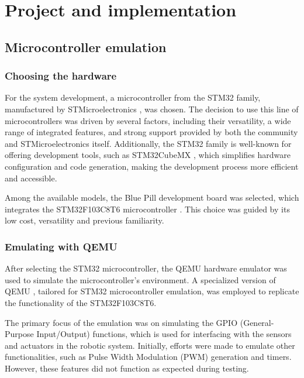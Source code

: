 \documentclass[../../monografia.tex]{subfiles}
\begin{document}
\section{Project and implementation}

\subsection{Microcontroller emulation}

\subsubsection{Choosing the hardware}

For the system development, a microcontroller from the STM32 family, manufactured by STMicroelectronics \cite{STMicroelectronics_23}, was chosen. The decision to use this line of microcontrollers was driven by several factors, including their versatility, a wide range of integrated features, and strong support provided by both the community and STMicroelectronics itself. Additionally, the STM32 family is well-known for offering development tools, such as STM32CubeMX \cite{STM32CubeMX_23}, which simplifies hardware configuration and code generation, making the development process more efficient and accessible. 

Among the available models, the Blue Pill \cite{BluePill_23} development board was selected, which integrates the STM32F103C8T6 microcontroller \cite{STM32F103C8T6_Datasheet_23}. This choice was guided by its low cost, versatility and previous familiarity.

\subsubsection{Emulating with QEMU}

After selecting the STM32 microcontroller, the QEMU hardware emulator was used to simulate the microcontroller’s environment. A specialized version of QEMU \cite{QEMU_STM32_23}, tailored for STM32 microcontroller emulation, was employed to replicate the functionality of the STM32F103C8T6.

The primary focus of the emulation was on simulating the GPIO (General-Purpose Input/Output) functions, which is used for interfacing with the sensors and actuators in the robotic system. Initially, efforts were made to emulate other functionalities, such as Pulse Width Modulation (PWM) generation and timers. However, these features did not function as expected during testing.
\end{document}
